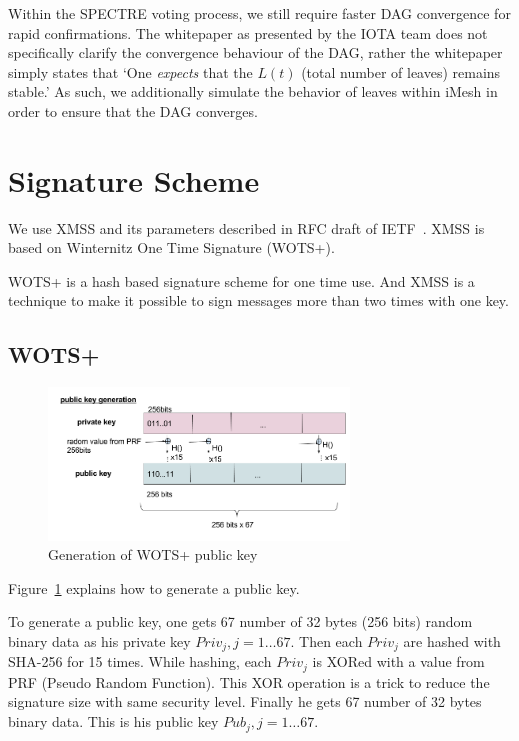 \documentclass[a4paper,10pt,twocolumn]{article}
\begin{document}
Within the SPECTRE voting process, we still require faster DAG convergence for rapid confirmations. The whitepaper as presented by the 
IOTA team does not specifically clarify the convergence behaviour of the DAG, rather the whitepaper simply states that `One 
\emph{expects} that the \( L(t) \) (total number of leaves) remains stable.' As such, we additionally simulate the behavior of leaves 
within iMesh in order to ensure that the DAG converges.

\section{Signature Scheme}
\label{sec:sig}

We use XMSS and its parameters described in RFC draft of IETF~\cite{ietf}.
XMSS is based on Winternitz One Time Signature (WOTS+). 

WOTS+ is a hash based signature scheme for one time use.
And XMSS is a technique to make it possible to sign messages more than two times with one key.

\subsection{WOTS+}

\begin{figure}[ht]
	\begin{center}
	\includegraphics[width=80mm]{wots_pub.png}
	  \caption{Generation of WOTS+ public key}
    \label{fig:wots_pub}
	\end{center}
 \end{figure}

 Figure~\ref{fig:wots_pub} explains how to generate a public key.

 To generate a public key, one gets 67 number of 32 bytes (256 bits) random binary data as his private key \( Priv_{j}, j=1 \ldots 67\).
 Then each \( Priv_{j} \) are hashed with SHA-256 for 15 times. While hashing, each  \( Priv_{j} \) is XORed with a value from PRF (Pseudo Random Function).
 This XOR operation is a trick to reduce the signature size with same security level.
 Finally he gets 67 number of 32 bytes binary data. This is his public key \( Pub_{j}, j=1 \ldots 67\).
\end{document}
